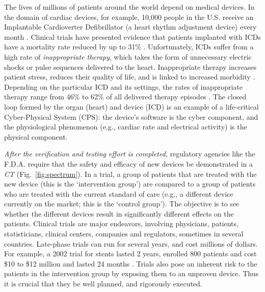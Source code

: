 The lives of millions of patients around the world depend on medical devices.
In the domain of cardiac devices, for example,
10,000 people in the U.S. receive an Implantable Cardioverter Defibrillator (a heart rhythm adjustment device) every month \cite{asktheicd}.
Clinical trials have presented evidence that patients implanted with ICDs have a mortality rate reduced by up to 31\% \cite{maditrit}.
Unfortunately, ICDs suffer from a high rate of \emph{inappropriate therapy}, which takes the form of unnecessary electric shocks or pulse sequences delivered to the heart.
Inappropriate therapy increases patient stress, reduces their quality of life, and is linked to increased morbidity \cite{shock_mortality}.
Depending on the particular ICD and its settings, the rates of inappropriate therapy range from 46\% to 62\% of all delivered therapy episodes \cite{GoldABBTB11_RIGHTresults}.
The closed loop formed by the organ (heart) and device (ICD) is an example of a life-critical Cyber-Physical System (CPS): the device's software is the cyber component, and the physiological phenomenon (e.g., cardiac rate and electrical activity) is the physical component.

\emph{After the verification and testing effort is completed}, regulatory agencies like the F.D.A. require that the safety and efficacy of new devices be demonstrated in a \emph{\ac{CT}} (Fig.~\ref{fig:spectrum}).
In a trial, a group of patients that are treated with the new device (this is the `intervention group') are compared to a group of patients who are treated with the current standard of care (e.g., a different device currently on the market; this is the `control group').
The objective is to see whether the different devices result in significantly different effects on the patients.
Clinical trials are major endeavors, involving physicians, patients, statisticians, clinical centers, companies and regulators, sometimes in several countries.
Late-phase trials can run for several years, and cost millions of dollars.
For example, a 2002 trial for stents lasted 2 years, enrolled 800 patients and cost \$10 to \$12 million and lasted 24 months \cite{Kaplan04_Cost}.
Trials also pose an inherent risk to the patients in the intervention group by exposing them to an unproven device.
Thus it is crucial that they be well planned, and rigorously executed.

